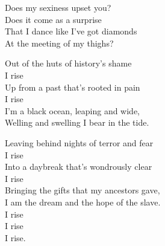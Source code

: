 \documentclass[12pt, openany, letterpaper]{memoir}
\begin{document}
\begin{minipage}[t]{0.49\linewidth}

	Does my sexiness upset you?\\
	Does it come as a surprise\\
	That I dance like I've got diamonds\\
	At the meeting of my thighs?

	Out of the huts of history’s shame\\
	I rise\\
	Up from a past that’s rooted in pain\\
	I rise\\
	I'm a black ocean, leaping and wide,\\
	Welling and swelling I bear in the tide.

	Leaving behind nights of terror and fear\\
	I rise\\
	Into a daybreak that’s wondrously clear\\
	I rise\\
	Bringing the gifts that my ancestors gave,\\
	I am the dream and the hope of the slave.\\
	I rise\\
	I rise\\
	I rise.

\end{minipage}
\end{document}
